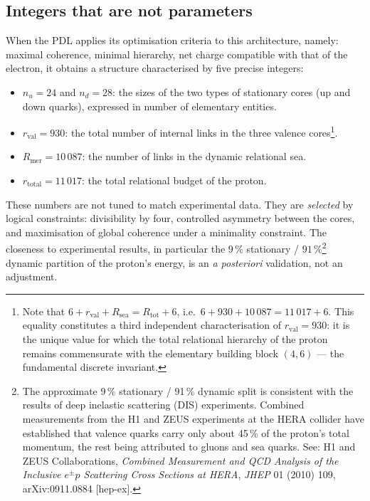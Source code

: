 \documentclass[12pt, a4paper, openright]{book}
\begin{document}
\subsection*{Integers that are not parameters}

When the PDL applies its optimisation criteria to this architecture, namely: maximal coherence, minimal hierarchy, net charge compatible with that of the electron, it obtains a structure characterised by five precise integers:

\begin{itemize}
\item $n_u = 24$ and $n_d = 28$: the sizes of the two types of stationary cores (up and down quarks), expressed in number of elementary entities.
\item $r_{\text{val}} = 930$: the total number of internal links in the three valence cores\footnote{Note that $6 + r_{\text{val}} + R_{\text{sea}} = R_{\text{tot}} + 6$, i.e.\ $6 + 930 + 10\,087 = 11\,017 + 6$. This equality constitutes a third independent characterisation of $r_{\text{val}} = 930$: it is the unique value for which the total relational hierarchy of the proton remains commensurate with the elementary building block $(4,6)$ --- the fundamental discrete invariant.}.
\item $R_{\text{mer}} = 10\,087$: the number of links in the dynamic relational sea.
\item $r_{\text{total}} = 11\,017$: the total relational budget of the proton.
\end{itemize}

These numbers are not tuned to match experimental data. They are \emph{selected} by logical constraints: divisibility by four, controlled asymmetry between the cores, and maximisation of global coherence under a minimality constraint. The closeness to experimental results, in particular the $9\,\%$ stationary / $91\,\%$\footnote{The approximate 9\,\% stationary / 91\,\% dynamic split is consistent with the results of deep inelastic scattering (DIS) experiments. Combined measurements from the H1 and ZEUS experiments at the HERA collider have established that valence quarks carry only about 45\,\% of the proton's total momentum, the rest being attributed to gluons and sea quarks. See: H1 and ZEUS Collaborations, \textit{Combined Measurement and QCD Analysis of the Inclusive $e^{\pm}p$ Scattering Cross Sections at HERA}, \textit{JHEP} 01 (2010) 109, arXiv:0911.0884 [hep-ex].} dynamic partition of the proton's energy, is an \emph{a posteriori} validation, not an adjustment.
\end{document}
